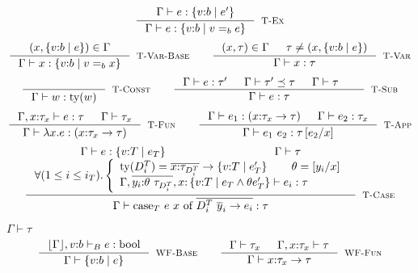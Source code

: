 \documentclass[10pt,a4paper]{article}
\newcommand\rulename[1]{\textsc{#1}\xspace}
\newcommand\rwbase{\rulename{WF-Base}}
\newcommand\rwfun{\rulename{WF-Fun}}
\newcommand\rwcon{\rulename{WF-Con}}
\newcommand\rtvar{\rulename{T-Var}}
\newcommand\rtvarbase{\rulename{T-Var-Base}}
\newcommand\rtconst{\rulename{T-Const}}
\newcommand\rtsub{\rulename{T-Sub}}
\newcommand\rtexact{\rulename{T-Ex}}
\newcommand\rtcase{\rulename{T-Case}}
\newcommand\rtfun{\rulename{T-Fun}}
\newcommand\rtapp{\rulename{T-App}}
\newcommand\dcti{\dct{i}}
\newcommand\dct[1]{\ensuremath{D^T_{#1}}}
\newcommand\efun[2]{\ensuremath{\lambda #1 . #2}}
\newcommand\eapp[2]{\ensuremath{#1 \ #2}}
\newcommand\edata[2]{\ensuremath{#1 \ #2}}
\newcommand\ecase[5]{\ensuremath{\text{case}_T\ #1\ #2\ \text{of}\ \overline{\edata{#3}{#4} \rightarrow #5}}}
\newcommand\tbool{\ensuremath{\text{bool}}}
\newcommand\tref[3]{\ensuremath{\left\lbrace {#1} \colon {#2} \mid {#3} \right\rbrace}}
\newcommand\tconref[4]{\tref{#3}{\tcon{#1}{#2}}{#4}}
\newcommand\tcon[2]{\ensuremath{#1\ #2}}
\newcommand\tfun[3]{\ensuremath{#1\colon #2 \rightarrow #3}}
\newcommand\tfunref[5]{\tfun{#1}{#2}{#3}}
\newcommand\eqb[1]{\ensuremath{=_{#1}}}
\newcommand\tforalli[1]{\ensuremath{\forall (1\leq i\leq i_{#1})}}
\newcommand\ty[1]{\ensuremath{\text{ty}({#1})}}
\newcommand\sub[2]{\ensuremath{\left[ #2 / #1 \right]}}
\newcommand\erase[1]{\ensuremath{\lfloor #1 \rfloor}}
\newcommand\hastype[3]{\ensuremath{#1 \vdash #2 : #3}}
\newcommand\hastypebase[3]{\ensuremath{#1 \vdash_B #2 : #3}}
\newcommand\iswellformed[2]{\ensuremath{#1 \vdash #2}}
\newcommand\issubtype[3]{\ensuremath{#1 \vdash #2 \preceq #3}}
\begin{document}
$$
\inference{
	\hastype{\Gamma}{e}{\tref{v}{b}{e'}}
}{
	\hastype{\Gamma}{e}{\tref{v}{b}{v \eqb{b} e}}
}[\rtexact]
$$
$$
\inference{
	(x,\tref{v}{b}{e}) \in \Gamma
}{
	\hastype{\Gamma}{x}{\tref{v}{b}{v \eqb{b} x}}
}[\rtvarbase]
\qquad
\inference{
	(x,\tau) \in \Gamma &&
	\tau \neq (x,\tref{v}{b}{e})
}{
	\hastype{\Gamma}{x}{\tau}
}[\rtvar]
$$
$$
\inference{
}{
	\hastype{\Gamma}{w}{\ty{w}}
}[\rtconst]
\qquad
\inference{
	\hastype{\Gamma}{e}{\tau'} &&
	\issubtype{\Gamma}{\tau'}{\tau} &&
	\iswellformed{\Gamma}{\tau} &&
}{
	\hastype{\Gamma}{e}{\tau}
}[\rtsub]
$$
$$
\inference{
	\hastype{\Gamma, x\colon\tau_x}{e}{\tau} &&
	\iswellformed{\Gamma}{\tau_x}
}{
	\hastype{\Gamma}{\efun{x}{e}}{(\tfun{x}{\tau_x}{\tau})}
}[\rtfun]
\qquad
\inference{
	\hastype{\Gamma}{e_1}{(\tfunref{x}{\tau_{x}}{\tau}{v}{e_v})} &&
	\hastype{\Gamma}{e_2}{\tau_{x}}
}{
	\hastype{\Gamma}{\eapp{e_1}{e_2}}{\tau\sub{x}{e_2}}
}[\rtapp]
$$
$$
\inference{
	\hastype{\Gamma}{e}{\tref{v}{T}{e_T}} && \iswellformed{\Gamma}{\tau}\\
	\tforalli{T}. \left\lbrace
	\begin{array}{ll}
 	\ty{\dcti} = \overline{x\colon\tau_{\dcti}}\rightarrow \tref{v}{T}{e'_T} \qquad
 	\theta = \sub{x}{y_i} \cr
	\hastype{\Gamma, \overline{y_i\colon\theta\ \tau_{\dcti}}, 
				x\colon \tref{v}{T}{e_T \land \theta e'_T}
				}{e_i}{\tau}
	\end{array} \right.
}{
	\hastype{\Gamma}{\ecase{e}{x}{\dcti}{\overline{y}_i}{e_i}}{\tau}
}[\rtcase]
$$


\hfill\mbox{\iswellformed{\Gamma}{\tau}}
$$
\inference{
	\hastypebase{\erase{\Gamma}, v\colon b}{e}{\tbool}
}{
	\iswellformed{\Gamma}{\tref{v}{b}{e}}
}[\rwbase]
\qquad
\inference{
	\iswellformed{\Gamma}{\tau_x} &&
	\iswellformed{\Gamma, x \colon \tau_x}{\tau}
}{
	\iswellformed{\Gamma}{\tfunref{x}{\tau_x}{\tau}{v}{e}}
}[\rwfun]
$$
\end{document}
